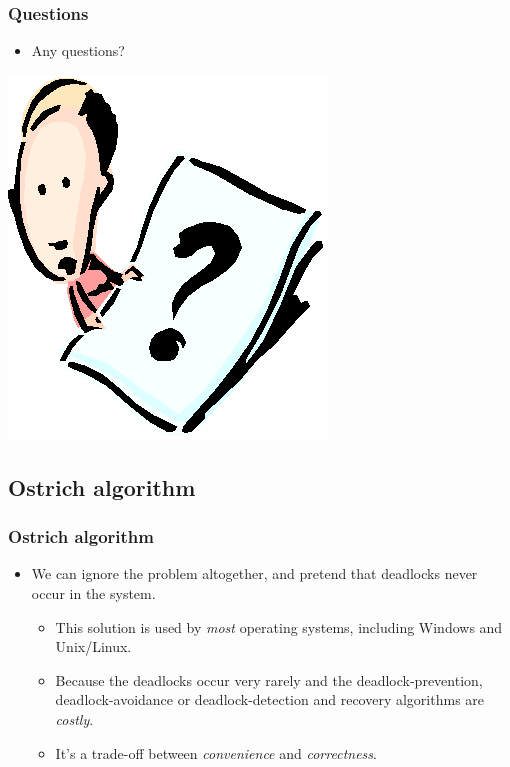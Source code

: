 \documentclass[CJKutf8,xcolor=pdftex,dvipsnames,table]{beamer}
\begin{document}
\begin{CJK*}{UTF8}{song}
  \begin{frame}
  \frametitle{Questions}
  \begin{itemize}
  \item{Any questions?}
  \end{itemize}
  \begin{center}
    \includegraphics[scale=.5]{question}
  \end{center}
  \end{frame}

  \subsection{Ostrich algorithm}

  \begin{frame}
  \frametitle{Ostrich algorithm} \pause
  \begin{itemize}
	\item{We can ignore the problem altogether, and pretend that deadlocks never occur in the system.} \pause
	\begin{itemize}
		\item{This solution is used by \emph{most} operating systems, including Windows and Unix/Linux.} \pause
		\item{Because the deadlocks occur very rarely and the deadlock-prevention, deadlock-avoidance or deadlock-detection and recovery algorithms are \emph{costly}.} \pause
		\item{It's a trade-off between \emph{convenience} and \emph{correctness}.}
	\end{itemize}
  \end{itemize}
  \end{frame}


\end{CJK*}
\end{document}
